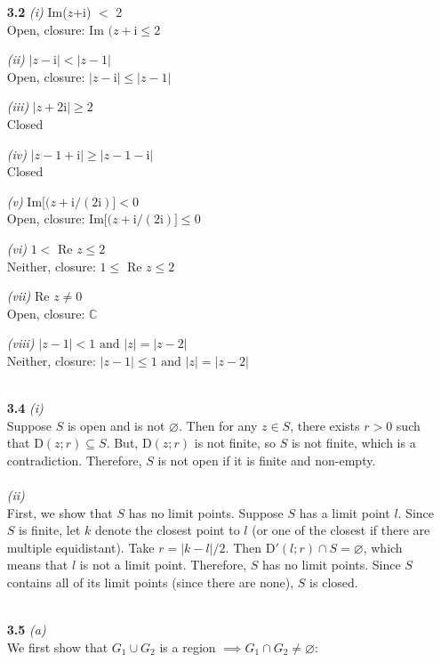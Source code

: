 \begin{enumerate}

\item[\textbf{3.2}]
\textit{(i)} Im($z$+i) $<$ 2 \\
Open, closure: Im $(z+\mathrm{i}\le2$

\textit{(ii)} $|z-\mathrm{i}| < |z-1|$ \\
Open, closure: $|z-\mathrm{i}| \le |z-1|$ 

\textit{(iii)} $|z+2\mathrm{i}| \ge 2$ \\
Closed

\textit{(iv)} $|z-1+\mathrm{i}| \ge |z-1-\mathrm{i}|$ \\
Closed

\textit{(v)} Im[$(z+\mathrm{i}/(2\mathrm{i})] < 0$ \\
Open, closure: Im[$(z+\mathrm{i}/(2\mathrm{i})] \le 0$

\textit{(vi)} $1 < $ Re $z \le2$ \\
Neither, closure: $1 \le $ Re $z \le2$ 

\textit{(vii)} Re $z\ne0$ \\
Open, closure: $\mathbb{C}$

\textit{(viii)} $|z-1| < 1 \text{ and } |z| = |z-2|$ \\
Neither, closure: $|z-1| \le 1 \text{ and } |z| = |z-2|$
\\\\
\item[\textbf{3.4}]
\textit{(i)} \\
Suppose $S$ is open and is not $\varnothing$. Then for any $z \in S$, there exists $r>0$ such that D$(z;r)\subseteq S$. But, D$(z;r)$ is not finite, so $S$ is not finite, which is a contradiction. Therefore, $S$ is not open if it is finite and non-empty. 
\\\\
\textit{(ii)} \\
First, we show that $S$ has no limit points. Suppose $S$ has a limit point $l$. Since $S$ is finite, let $k$ denote the closest point to $l$ (or one of the closest if there are multiple equidistant). Take $r = |k-l|/2$. Then D$'(l;r) \cap S = \varnothing$, which means that $l$ is not a limit point. Therefore, $S$ has no limit points. Since $S$ contains all of its limit points (since there are none), $S$ is closed.
\\\\
\item[\textbf{3.5}]
\textit{(a)} \\
We first show that $G_1 \cup G_2$ is a region $\implies G_1 \cap G_2 \ne \varnothing$:


\end{enumerate}
